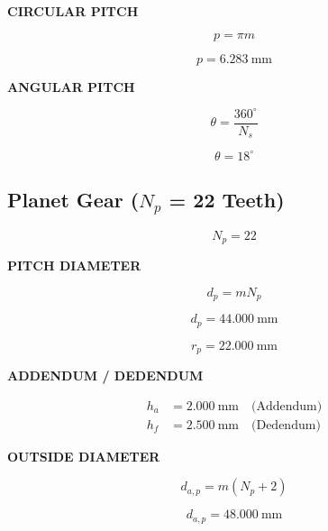 \documentclass{article}
\begin{document}
\textbf{CIRCULAR PITCH}

\begin{equation}
p = \pi m
\end{equation}

\begin{equation}
p = 6.283\ \mathrm{mm}
\end{equation}

\textbf{ANGULAR PITCH}

\begin{equation}
\theta = \frac{360^\circ}{N_s}
\end{equation}

\begin{equation}
\theta = 18^\circ
\end{equation}


\subsection{\textbf{Planet Gear ($N_p$ = 22 Teeth)}}

\begin{equation}
N_p = 22
\end{equation}

\textbf{PITCH DIAMETER}

\begin{equation}
d_p = mN_p
\end{equation}

\begin{equation}
d_p = 44.000\ \mathrm{mm}
\end{equation}

\begin{equation}
r_p = 22.000\ \mathrm{mm}
\end{equation}

\textbf{ADDENDUM / DEDENDUM}

\begin{align}
h_a &= 2.000\ \mathrm{mm} \quad \text{(Addendum)}\\
h_f &= 2.500\ \mathrm{mm} \quad \text{(Dedendum)}
\end{align}

\textbf{OUTSIDE DIAMETER}

\begin{equation}
d_{a,p} = m(N_p+2)
\end{equation}

\begin{equation}
d_{a,p} = 48.000\ \mathrm{mm}
\end{equation}
\end{document}
